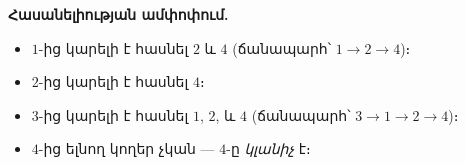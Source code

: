 \documentclass[12pt, a4paper]{article}
\begin{document}
\medskip

\textbf{Հասանելիության ամփոփում.}
\begin{itemize}[nosep]
  \item $1$-ից կարելի է հասնել $2$ և $4$ \;(ճանապարհ՝ $1 \to 2 \to 4$)։
  \item $2$-ից կարելի է հասնել $4$։
  \item $3$-ից կարելի է հասնել $1$, $2$, և $4$ \;(ճանապարհ՝ $3 \to 1 \to 2 \to 4$)։
  \item $4$-ից ելնող կողեր չկան — $4$-ը \emph{կլանիչ} է։
\end{itemize}
\end{document}
